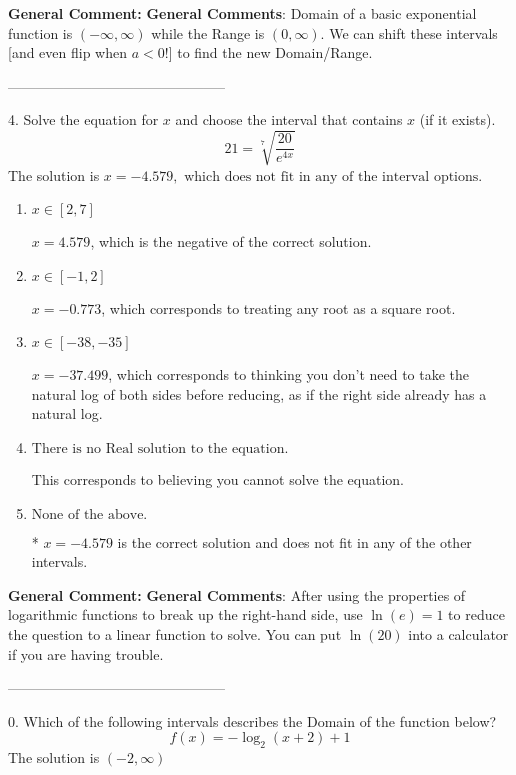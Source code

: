 \documentclass{extbook}[14pt]
\begin{document}
\textbf{General Comment:} \textbf{General Comments}: Domain of a basic exponential function is $(-\infty, \infty)$ while the Range is $(0, \infty)$. We can shift these intervals [and even flip when $a<0$!] to find the new Domain/Range. 

-----------------------------------------------

4.  Solve the equation for $x$ and choose the interval that contains $x$ (if it exists).
\[  21 = \sqrt[7]{\frac{20}{e^{4x}}} \] 
The solution is $ x = -4.579, \text{ which does not fit in any of the interval options.} $ 

\begin{enumerate}[label=\Alph*.] 
\item $ x \in [2, 7] $ 

 $x = 4.579$, which is the negative of the correct solution. 
\item $ x \in [-1, 2] $ 

 $x = -0.773$, which corresponds to treating any root as a square root. 
\item $ x \in [-38, -35] $ 

 $x = -37.499$, which corresponds to thinking you don't need to take the natural log of both sides before reducing, as if the right side already has a natural log. 
\item $ \text{There is no Real solution to the equation.} $ 

 This corresponds to believing you cannot solve the equation. 
\item $ \text{None of the above.} $ 

 * $x = -4.579$ is the correct solution and does not fit in any of the other intervals. 
\end{enumerate} 
 
\textbf{General Comment:} \textbf{General Comments}: After using the properties of logarithmic functions to break up the right-hand side, use $\ln(e) = 1$ to reduce the question to a linear function to solve. You can put $\ln(20)$ into a calculator if you are having trouble. 

-----------------------------------------------

0. Which of the following intervals describes the Domain of the function below?
\[ f(x) = -\log_2{(x+2)}+1 \] 
The solution is $ (-2, \infty) $ 
\end{document}
